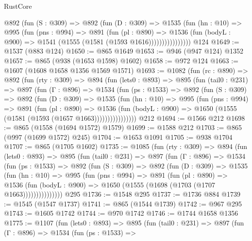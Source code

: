 \begin{lexlean}{RustCore}
\begin{coremodule}
                @892
                  (fun (S : @309) =>
                  @892
                    (fun (D : @309) =>
                    @1535
                      (fun (hn : @10) =>
                      @995
                        (fun (pns : @994) =>
                        @891
                          (fun (pl : @890) =>
                          @1536
                            (fun (bodyL : @900) => @1541 (@1555 (@1581 (@1593 @1616))))))))))))))))
    @124
@1649 := @1537 (@883 @124)
@1650 := @865 @1649
@1653 := @946 (@947 @124) @1352
@1657 := @865 (@938 (@1653 @1598) @1602)
@1658 := @972 @124
@1663 := @1607 (@1608 @1658 @1356 @1569 @1571)
@1693 := @1082
    (fun (rc : @890) =>
    @892
      (fun (rty : @309) =>
      @894
        (fun (lets0 : @893) =>
        @895
          (fun (tail0 : @231) =>
          @897
            (fun (Γ : @896) =>
            @1534
              (fun (ps : @1533) =>
              @892
                (fun (S : @309) =>
                @892
                  (fun (D : @309) =>
                  @1535
                    (fun (hn : @10) =>
                    @995
                      (fun (pns : @994) =>
                      @891
                        (fun (pl : @890) =>
                        @1536
                          (fun (bodyL : @900) =>
                          @1650 (@1555 (@1581 (@1593 (@1657 @1663))))))))))))))))
    @212
@1694 := @1566 @212
@1698 := @865 (@1558 (@1694 @1572) @1579)
@1699 := @1588 @212
@1703 := @865 (@997 (@1699 @1572) @245)
@1704 := @1653 @1091
@1705 := @938 @1704
@1707 := @865 (@1705 @1602)
@1735 := @1085
    (fun (rty : @309) =>
    @894
      (fun (lets0 : @893) =>
      @895
        (fun (tail0 : @231) =>
        @897
          (fun (Γ : @896) =>
          @1534
            (fun (ps : @1533) =>
            @892
              (fun (S : @309) =>
              @892
                (fun (D : @309) =>
                @1535
                  (fun (hn : @10) =>
                  @995
                    (fun (pns : @994) =>
                    @891
                      (fun (pl : @890) =>
                      @1536
                        (fun (bodyL : @900) =>
                        @1650 (@1555 (@1698 (@1703 (@1707 @1663)))))))))))))))
    @295
@1736 := @1548 @295
@1737 := @1736 @884
@1739 := @1545 (@1547 @1737)
@1741 := @865 (@1544 @1739)
@1742 := @967 @295
@1743 := @1605 @1742
@1744 := @970 @1742
@1746 := @1744 @1658 @1356
@1775 := @1107
    (fun (lets0 : @893) =>
    @895
      (fun (tail0 : @231) =>
      @897
        (fun (Γ : @896) =>
        @1534
          (fun (ps : @1533) =>

\end{coremodule}
\end{lexlean}
